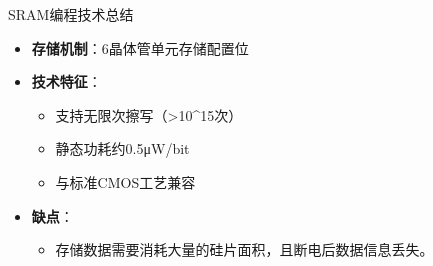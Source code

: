 \begin{frame}
\begin{block}{SRAM编程技术总结}
\label{sramux7f16ux7a0bux6280ux672fux603bux7ed3}
\begin{itemize}
\tightlist
\item
    \textbf{存储机制}：6晶体管单元存储配置位\\
\item
    \textbf{技术特征}：

    \begin{itemize}
    \tightlist
    \item
    支持无限次擦写（\textgreater10\^{}15次）\\
    \item
    静态功耗约0.5μW/bit\\
    \item
    与标准CMOS工艺兼容\\
    \end{itemize}
\item
    \textbf{缺点}：

    \begin{itemize}
    \tightlist
    \item
    存储数据需要消耗大量的硅片面积，且断电后数据信息丢失。
    \end{itemize}
\end{itemize}
\end{block}
\end{frame}



